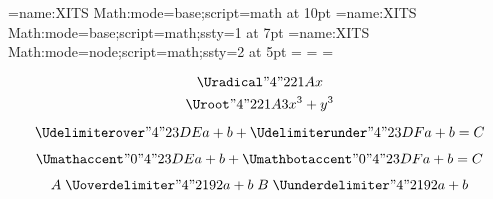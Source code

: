 

\font\4={name:XITS Math:mode=base;script=math} at 10pt
\font\5={name:XITS Math:mode=base;script=math;ssty=1} at 7pt
\font\6={name:XITS Math:mode=node;script=math;ssty=2} at 5pt
=\4 =\5 =\6

$$\Uradical "4 "221A {x}$$
$$\Uroot    "4 "221A {3}{x^3+y^3}$$

$$
  \Udelimiterover  "4 "23DE {a+b}
+ \Udelimiterunder "4 "23DF {a+b} = C
$$

$$
  \Umathaccent    "0 "4 "23DE {a+b}
+ \Umathbotaccent "0 "4 "23DF {a+b} = C
$$

$$
A \mathrel{\Uoverdelimiter  "4 "2192 {a+b}}
B \mathrel{\Uunderdelimiter "4 "2192 {a+b}}
$$

\bye

